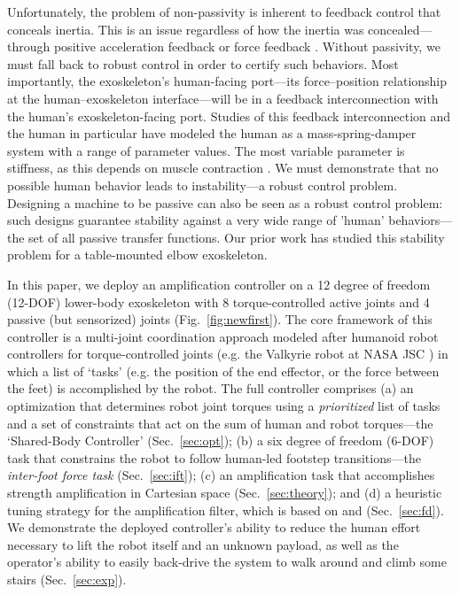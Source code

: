 \documentclass[utf8]{frontiersSCNS}
\renewcommand*{\cite}[1]{\citep{#1}}
\begin{document}
Unfortunately, the problem of non-passivity is inherent to feedback control that conceals inertia. This is an issue regardless of how the inertia was concealed---through positive acceleration feedback \cite{Kazerooni2005IROS} or force feedback \cite{BuergerHogan2007TRO}.
Without passivity, we must fall back to robust control in order to certify such behaviors. 
Most importantly, the exoskeleton's human-facing port---its force--position relationship at the human--exoskeleton interface---will be in a feedback interconnection with the human's exoskeleton-facing port.
Studies of this feedback interconnection \cite{Kazerooni1990TSMC,BuergerHogan2007TRO,BuergerHogan2006IROS,HeThomasPaineSentis2019ACC} and the human in particular \cite{HeHuangThomasSentis2019IROS,HeHuangThomasSentis2020TNSRE} have modeled the human as a mass-spring-damper system with a range of parameter values. The most variable parameter is stiffness, as this depends on muscle contraction \cite{Hogan1984TAC}.
We must demonstrate that no possible human behavior leads to instability---a robust control problem.
Designing a machine to be passive \cite{ColgateHogan1988IJC,Hogan1989ICRA,ColgateBrown1994ICRA,AdamsHannaford1999TRA} can also be seen as a robust control problem: such designs guarantee stability against a very wide range of 'human' behaviors---the set of all passive transfer functions. Our prior work \cite{ThomasCoholichSentis2019AIM,HeThomasPaineSentis2019ACC,HeHuangThomasSentis2019IROS,HeHuangThomasSentis2020TNSRE} has studied this stability problem for a table-mounted elbow exoskeleton.


In this paper, we deploy an amplification controller on a 12 degree of freedom (12-DOF) lower-body exoskeleton with 8 torque-controlled active joints and 4 passive (but sensorized) joints (Fig.~\ref{fig:newfirst}). The core framework of this controller is a multi-joint coordination approach modeled after humanoid robot controllers for torque-controlled joints \cite{SentisParkKhatib2010TRO,KimEA2016TRO} (e.g. the Valkyrie robot at NASA JSC \cite{RadfordEA2015JFR,PaineEA2015JFR}) in which a list of `tasks' (e.g. the position of the end effector, or the force between the feet) is accomplished by the robot.
The full controller comprises (a) an optimization that determines robot joint torques using a \emph{prioritized} list of tasks and a set of constraints that act on the sum of human and robot torques---the `Shared-Body Controller' (Sec.~\ref{sec:opt}); (b) a six degree of freedom (6-DOF) task that constrains the robot to follow human-led footstep transitions---the \emph{inter-foot force task} (Sec.~\ref{sec:ift}); (c) an amplification task that accomplishes strength amplification in Cartesian space (Sec.~\ref{sec:theory}); and (d) a heuristic tuning strategy for the amplification filter, which is based on \cite{HeThomasPaineSentis2019ACC} and \cite{ThomasCoholichSentis2019AIM} (Sec.~\ref{sec:fd}). We demonstrate the deployed controller's ability to reduce the human effort necessary to lift the robot itself and an unknown payload, as well as the operator's ability to easily back-drive the system to walk around and climb some stairs (Sec.~\ref{sec:exp}).
\end{document}

